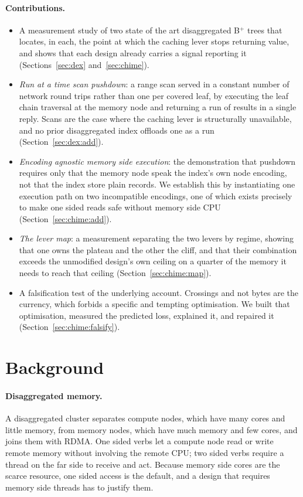 \documentclass[sigconf,nonacm]{acmart}
\begin{document}
\paragraph{Contributions.}
\begin{itemize}
  \item A measurement study of two state of the art disaggregated B$^+$ trees
    that locates, in each, the point at which the caching lever stops returning
    value, and shows that each design already carries a signal reporting it
    (Sections~\ref{sec:dex} and~\ref{sec:chime}).
  \item \emph{Run at a time scan pushdown}: a range scan served in a constant
    number of network round trips rather than one per covered leaf, by executing
    the leaf chain traversal at the memory node and returning a run of results in
    a single reply. Scans are the case where the caching lever is structurally
    unavailable, and no prior disaggregated index offloads one as a run
    (Section~\ref{sec:dex:add}).
  \item \emph{Encoding agnostic memory side execution}: the demonstration that
    pushdown requires only that the memory node speak the index's own node
    encoding, not that the index store plain records. We establish this by
    instantiating one execution path on two incompatible encodings, one of which
    exists precisely to make one sided reads safe without memory side CPU
    (Section~\ref{sec:chime:add}).
  \item \emph{The lever map}: a measurement separating the two levers by regime,
    showing that one owns the plateau and the other the cliff, and that their
    combination exceeds the unmodified design's own ceiling on a quarter of the
    memory it needs to reach that ceiling (Section~\ref{sec:chime:map}).
  \item A falsification test of the underlying account. Crossings and not bytes
    are the currency, which forbids a specific and tempting optimisation. We built
    that optimisation, measured the predicted loss, explained it, and repaired it
    (Section~\ref{sec:chime:falsify}).
\end{itemize}

\section{Background}
\label{sec:bg}

\paragraph{Disaggregated memory.}
A disaggregated cluster separates compute nodes, which have many cores and little
memory, from memory nodes, which have much memory and few cores, and joins them
with RDMA. One sided verbs let a compute node read or write remote memory without
involving the remote CPU; two sided verbs require a thread on the far side to
receive and act. Because memory side cores are the scarce resource, one sided
access is the default, and a design that requires memory side threads has to
justify them.
\end{document}
